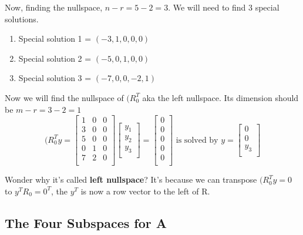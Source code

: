 Now, finding the nullspace, \(n - r = 5 - 2 = 3\). We will need to find 3 special solutions. 
\begin{enumerate}
    \item Special solution 1 = \((-3, 1, 0, 0, 0)\) 
    \item Special solution 2 = \((-5, 0, 1, 0, 0)\) 
    \item Special solution 3 = \((-7, 0, 0, -2, 1)\) 
\end{enumerate} 
Now we will find the nullspace of \((R^{T}_{0}\) aka the left nullspace. Its dimension should be \(m - r = 3 - 2 = 1\)  
\[
    (R^{T}_{0}y = 
    \begin{bmatrix}
        1 & 0 & 0  \\
        3 & 0 & 0  \\
        5 & 0 & 0  \\
        0 & 1 & 0  \\
        7 & 2 & 0  \\
    \end{bmatrix}
    \begin{bmatrix}
         y_1 \\
         y_2 \\
         y_3 \\
    \end{bmatrix}
    = 
    \begin{bmatrix}
         0 \\
         0 \\
         0 \\
         0 \\
         0 \\
    \end{bmatrix}
    \text{ is solved by }
    y = 
    \begin{bmatrix}
         0 \\
         0 \\
         y_3 \\
    \end{bmatrix}
\]

Wonder why it's called \textbf{left nullspace}? It's because we can transpose \((R^{T}_{0}y = 0\) to \(y^{T}R_0 = 0^T\), the \(y^T\) is now a row vector to the left of R.

\subsection{The Four Subspaces for A}